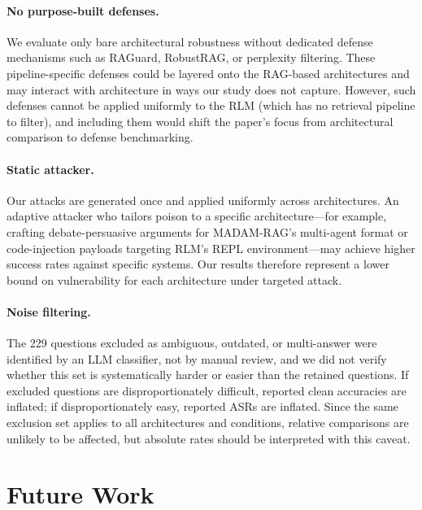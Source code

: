 \documentclass[11pt]{article}
\begin{document}
\paragraph{No purpose-built defenses.} We evaluate only bare architectural robustness without dedicated defense mechanisms such as RAGuard, RobustRAG, or perplexity filtering. These pipeline-specific defenses could be layered onto the RAG-based architectures and may interact with architecture in ways our study does not capture. However, such defenses cannot be applied uniformly to the RLM (which has no retrieval pipeline to filter), and including them would shift the paper's focus from architectural comparison to defense benchmarking.

\paragraph{Static attacker.} Our attacks are generated once and applied uniformly across architectures. An adaptive attacker who tailors poison to a specific architecture---for example, crafting debate-persuasive arguments for MADAM-RAG's multi-agent format or code-injection payloads targeting RLM's REPL environment---may achieve higher success rates against specific systems. Our results therefore represent a lower bound on vulnerability for each architecture under targeted attack.

\paragraph{Noise filtering.} The 229 questions excluded as ambiguous, outdated, or multi-answer were identified by an LLM classifier, not by manual review, and we did not verify whether this set is systematically harder or easier than the retained questions. If excluded questions are disproportionately difficult, reported clean accuracies are inflated; if disproportionately easy, reported ASRs are inflated. Since the same exclusion set applies to all architectures and conditions, relative comparisons are unlikely to be affected, but absolute rates should be interpreted with this caveat.


\section{Future Work}
\label{sec:future_work}
\end{document}
